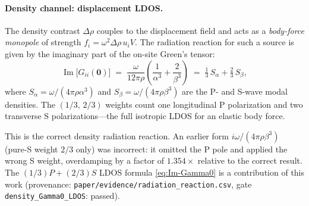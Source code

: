 \documentclass[11pt,a4paper]{article}
\newcommand{\D}{\Delta}
\theoremstyle{plain}
\theoremstyle{definition}
\theoremstyle{remark}
\begin{document}
\paragraph{Density channel: displacement LDOS.}
The density contrast $\D\rho$ couples to the displacement field and
acts as a \emph{body-force monopole} of strength $f_i = \omega^2\D\rho\,u_i V$.
The radiation reaction for such a source is given by the imaginary part of
the on-site Green's tensor:
\begin{equation}
  \operatorname{Im}\bigl[G_{ii}(\mathbf{0})\bigr]
  \;=\; \frac{\omega}{12\pi\rho}\!\left(\frac{1}{\alpha^3} + \frac{2}{\beta^3}\right)
  \;=\; \tfrac{1}{3}\,S_\alpha + \tfrac{2}{3}\,S_\beta,
  \label{eq:Im-Gamma0}
\end{equation}
where $S_\alpha = \omega/(4\pi\rho\alpha^3)$ and $S_\beta = \omega/(4\pi\rho\beta^3)$
are the P- and S-wave modal densities.  The $(1/3,\,2/3)$ weights count
one longitudinal P polarization and two transverse S polarizations---the
full isotropic LDOS for an elastic body force.

This is the correct density radiation reaction.  An earlier form
$i\omega/(4\pi\rho\beta^3)$ (pure-S weight $2/3$ only) was incorrect:
it omitted the P pole and applied the wrong S weight, overdamping by a
factor of $1.354\times$ relative to the correct result.  The
$(1/3)P+(2/3)S$ LDOS formula \eqref{eq:Im-Gamma0} is a contribution of
this work (provenance: \texttt{paper/evidence/radiation\_reaction.csv},
gate \texttt{density\_Gamma0\_LDOS}: passed).
\end{document}

